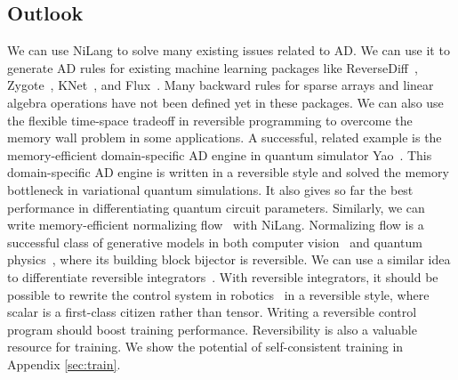 \documentclass{article}
\newcommand{\<}{\langle}
\renewcommand{\>}{\rangle}
\newcommand{\App}[1]{Appendix \ref{#1}}
\theoremstyle{definition}\newtheorem{definition}{\textit{Definition}}
\begin{document}
\subsection{Outlook}\label{sec:outlook}

We can use NiLang to solve many existing issues related to AD.
We can use it to generate AD rules for existing machine learning packages like ReverseDiff~\cite{ReverseDiff}, Zygote~\cite{Innes2019}, KNet~\cite{KNet}, and Flux~\cite{Innes2018a}.
Many backward rules for sparse arrays and linear algebra operations have not been defined yet in these packages.
We can also use the flexible time-space tradeoff in reversible programming to overcome the memory wall problem in some applications.
A successful, related example is the memory-efficient domain-specific AD engine in quantum simulator Yao~\cite{Luo2019}.
This domain-specific AD engine is written in a reversible style and solved the memory bottleneck in variational quantum simulations. It also gives so far the best performance in differentiating quantum circuit parameters.
Similarly, we can write memory-efficient normalizing flow~\cite{Kobyzev2019} with NiLang. Normalizing flow is a successful class of generative models in both computer vision~\cite{Kingma2018} and quantum physics~\cite{Dinh2016,Li2018}, where its building block bijector is reversible.
We can use a similar idea to differentiate reversible integrators~\cite{Hut1995, Laikov2018}.
With reversible integrators, it should be possible to rewrite the control system in robotics~\cite{Giftthaler2017} in a reversible style, where scalar is a first-class citizen rather than tensor.
Writing a reversible control program should boost training performance.
Reversibility is also a valuable resource for training.
We show the potential of self-consistent training in \App{sec:train}.
\end{document}
